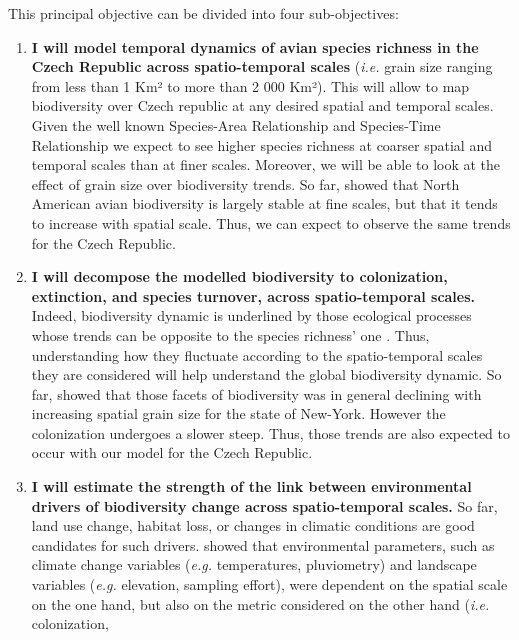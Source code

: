 \documentclass[
  12pt,
  oneside]{report}
\begin{document}
This principal objective can be divided into four sub-objectives:

\begin{enumerate}
\def\labelenumi{\arabic{enumi}.}
\item
  \textbf{I will model temporal dynamics of avian species richness in the Czech Republic across spatio-temporal scales} (\emph{i.e.} grain size ranging from less than 1 Km² to more than 2 000
  Km²). This will allow to map biodiversity over Czech republic at any desired spatial and
  temporal scales. Given the well known Species-Area Relationship \autocites[SAR,][]{arrhenius_species_1921,storch_untangling_2004} and Species-Time Relationship \autocite[STR,][]{white_comparison_2006} we expect to
  see higher species richness at coarser spatial and temporal scales than at finer scales.
  Moreover, we will be able to look at the effect of grain size over biodiversity trends. So far,
  \textcite{chase_species_2019} showed that North American avian biodiversity is largely stable at fine
  scales, but that it tends to increase with spatial scale. Thus, we can expect to observe the same
  trends for the Czech Republic.
\item
  \textbf{I will decompose the modelled biodiversity to colonization, extinction, and species turnover, across spatio-temporal scales.} Indeed, biodiversity dynamic is underlined by
  those ecological processes whose trends can be opposite to the species richness' one \autocite{dornelas_assemblage_2014}. Thus, understanding how they fluctuate according to the spatio-temporal scales
  they are considered will help understand the global biodiversity dynamic. So far, \textcite{jarzyna_spatial_2015} showed that those facets of biodiversity was in general declining with increasing
  spatial grain size for the state of New-York. However the colonization undergoes a slower
  steep. Thus, those trends are also expected to occur with our model for the Czech Republic.
\item
  \textbf{I will estimate the strength of the link between environmental drivers of biodiversity change across spatio-temporal scales.} So far, land use change, habitat loss, or changes in
  climatic conditions are good candidates for such drivers. \textcite{jarzyna_spatial_2015} showed that
  environmental parameters, such as climate change variables (\emph{e.g.} temperatures, pluviometry)
  and landscape variables (\emph{e.g.} elevation, sampling effort), were dependent on the spatial scale
  on the one hand, but also on the metric considered on the other hand (\emph{i.e.} colonization,

\end{enumerate}
\end{document}

